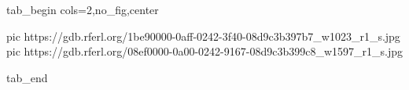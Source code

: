  
 
 
 
 

\ifcmt
  tab_begin cols=2,no_fig,center

     pic https://gdb.rferl.org/1be90000-0aff-0242-3f40-08d9c3b397b7_w1023_r1_s.jpg
		 pic https://gdb.rferl.org/08ef0000-0a00-0242-9167-08d9c3b399c8_w1597_r1_s.jpg

  tab_end
\fi
